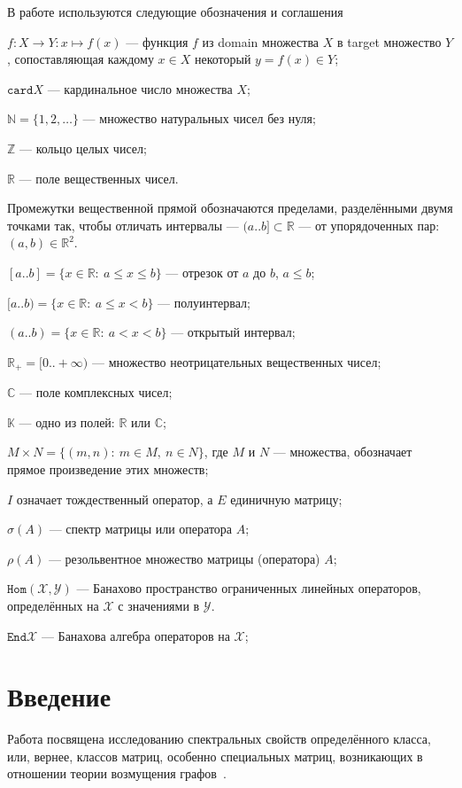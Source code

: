 \documentclass[14pt,a4paper]{extarticle}
\theoremstyle{definition}
\begin{document}
В работе используются следующие обозначения и соглашения

\( f: X\to Y: x\mapsto f(x) \) --- функция \( f \)
из domain множества \( X \) в target множество \( Y \),
сопоставляющая каждому \( x\in X \) некоторый \( y=f(x) \in Y\);

\( \mathtt{card}X \) --- кардинальное число множества \( X \);

\( \mathbb{N} = \{ 1, 2, \ldots \}\) --- множество натуральных чисел без нуля;

\( \mathbb{Z} \) --- кольцо целых чисел;

\( \mathbb{R} \) --- поле вещественных чисел.

Промежутки вещественной прямой обозначаются пределами, раз\-дел\-ёнными двумя
точками так, чтобы отличать интервалы  ---
\( (a..b] \subset \mathbb{R} \) --- от упорядоченных пар: \( (a, b)\in\mathbb{R}^2 \).

\( [a..b] = \{ x\in\mathbb{R}:\ a\leq x\leq b\} \) --- отрезок
от \( a \) до \( b \), \( a\leq b \);

\( [a..b) = \{ x\in\mathbb{R}:\ a\leq x < b\} \) --- полуинтервал;

\( (a..b) = \{ x\in\mathbb{R}:\ a < x < b\} \) --- открытый интервал;

\( \mathbb{R}_+ = [0..+\infty) \) --- множество неотрицательных вещественных чисел;

\( \mathbb{C} \) --- поле комплексных чисел;

\( \mathbb{K} \) --- одно из полей: \( \mathbb{R} \) или \( \mathbb{C} \);

\( M{\times}N = \{ (m, n):\ m{\in}M,\ n{\in}N \} \), где \( M \) и \( N \)
--- множества, обозначает прямое произведение этих множеств;

\( I \) означает тождественный оператор, а \( E \) единичную матрицу;

\( \sigma(A) \) --- спектр матрицы или оператора \( A \);

\( \rho(A) \) --- резольвентное множество матрицы (оператора) \( A \);

\( \mathtt{Hom}(\mathscr{X}, \mathscr{Y})\) --- Банахово пространство ограни\-чен\-ных
линейных операторов, определённых на \( \mathscr{X} \) с значениями в \( \mathscr{Y} \).

\( \mathtt{End}\mathscr{X} \) --- Банахова алгебра операторов на
\( \mathscr{X} \);

\newpage

\section{Введение}
Работа посвящена исследованию спектральных свойств определённого класса, или,
вернее, классов матриц,
особенно специальных матриц, возникающих в отношении теории возмущения
графов~\cite{cvetkovic1997eigenspaces}.
\end{document}
